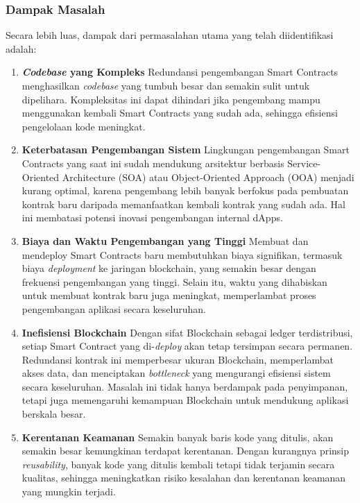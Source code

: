 \subsubsection{Dampak Masalah}
\label{subsubsec:dampak-masalah}

Secara lebih luas, dampak dari permasalahan utama yang telah diidentifikasi adalah:

\begin{enumerate}
  \item \textbf{\textit{Codebase} yang Kompleks} \newline
  Redundansi pengembangan Smart Contracts menghasilkan \textit{codebase} yang tumbuh besar dan semakin sulit untuk dipelihara. Kompleksitas ini dapat dihindari jika pengembang mampu menggunakan kembali Smart Contracts yang sudah ada, sehingga efisiensi pengelolaan kode meningkat.
  \item \textbf{Keterbatasan Pengembangan Sistem} \newline
  Lingkungan pengembangan Smart Contracts yang saat ini sudah mendukung arsitektur berbasis Service-Oriented Architecture (SOA) atau Object-Oriented Approach (OOA) menjadi kurang optimal, karena pengembang lebih banyak berfokus pada pembuatan kontrak baru daripada memanfaatkan kembali kontrak yang sudah ada. Hal ini membatasi potensi inovasi pengembangan internal dApps.
  \item \textbf{Biaya dan Waktu Pengembangan yang Tinggi} \newline 
  Membuat dan mendeploy Smart Contracts baru membutuhkan biaya signifikan, termasuk biaya \textit{deployment} ke jaringan blockchain, yang semakin besar dengan frekuensi pengembangan yang tinggi. Selain itu, waktu yang dihabiskan untuk membuat kontrak baru juga meningkat, memperlambat proses pengembangan aplikasi secara keseluruhan.
  \item \textbf{Inefisiensi Blockchain} \newline
  Dengan sifat Blockchain sebagai ledger terdistribusi, setiap Smart Contract yang di-\textit{deploy} akan tetap tersimpan secara permanen. Redundansi kontrak ini memperbesar ukuran Blockchain, memperlambat akses data, dan menciptakan \textit{bottleneck} yang mengurangi efisiensi sistem secara keseluruhan. Masalah ini tidak hanya berdampak pada penyimpanan, tetapi juga memengaruhi kemampuan Blockchain untuk mendukung aplikasi berskala besar.
  \item \textbf{Kerentanan Keamanan} \newline
  Semakin banyak baris kode yang ditulis, akan semakin besar kemungkinan terdapat kerentanan. Dengan kurangnya prinsip \textit{reusability}, banyak kode yang ditulis kembali tetapi tidak terjamin secara kualitas, sehingga meningkatkan risiko kesalahan dan kerentanan keamanan yang mungkin terjadi.
\end{enumerate}